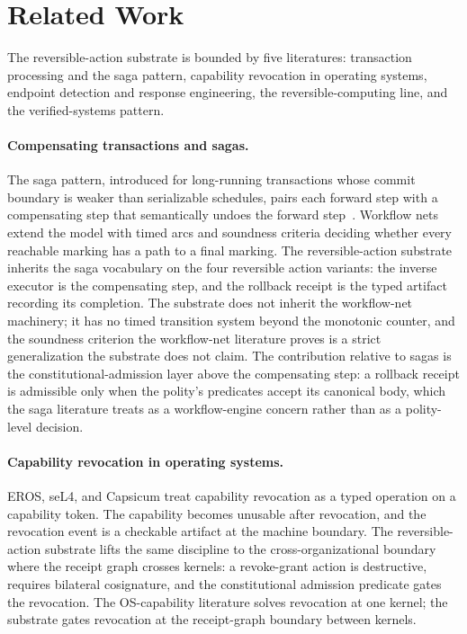 \section{Related Work}
\label{sec:related-ra}

The reversible-action substrate is bounded by five literatures:
transaction processing and the saga pattern, capability revocation in
operating systems, endpoint detection and response engineering, the
reversible-computing line, and the verified-systems pattern.

\paragraph{Compensating transactions and sagas.}
The saga pattern, introduced for long-running transactions whose
commit boundary is weaker than serializable schedules, pairs each
forward step with a compensating step that semantically undoes the
forward step~\cite{garciamolina1987sagas}. Workflow nets extend the model with
timed arcs and soundness criteria deciding whether every reachable
marking has a path to a final marking. The reversible-action substrate
inherits the saga vocabulary on the four reversible action variants:
the inverse executor is the compensating step, and the rollback
receipt is the typed artifact recording its completion. The substrate
does not inherit the workflow-net machinery; it has no timed
transition system beyond the monotonic counter, and the soundness
criterion the workflow-net literature proves is a strict
generalization the substrate does not claim. The contribution relative
to sagas is the constitutional-admission layer above the compensating
step: a rollback receipt is admissible only when the polity's
predicates accept its canonical body, which the saga literature treats
as a workflow-engine concern rather than as a polity-level decision.

\paragraph{Capability revocation in operating systems.}
EROS, seL4, and Capsicum treat capability revocation as a typed
operation on a capability token. The capability becomes unusable after
revocation, and the revocation event is a checkable artifact at the
machine boundary. The reversible-action substrate lifts the same
discipline to the cross-organizational boundary where the receipt
graph crosses kernels: a revoke-grant action is destructive, requires
bilateral cosignature, and the constitutional admission predicate
gates the revocation. The OS-capability literature solves revocation
at one kernel; the substrate gates revocation at the receipt-graph
boundary between kernels.


